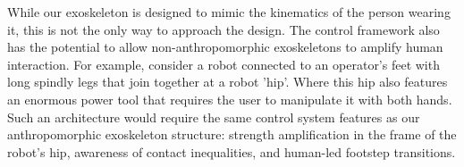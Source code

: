 \documentclass[utf8]{frontiersSCNS}
\renewcommand*{\cite}[1]{\citep{#1}}
\newcommand{\add}[1]{\textcolor[HTML]{8710b3}{#1}}
\begin{document}
While our exoskeleton is designed to mimic the kinematics of the person wearing it, this is not the only way to \add{approach} the design. The control framework also has the potential to allow non-anthropomorphic exoskeletons to amplify human interaction. \add{For example, consider} a robot connected to an operator's feet with long spindly legs that join together at a robot 'hip'. \add{Where} this hip also features an enormous power tool that requires the user to manipulate it with both hands. Such an architecture would require the same control system features as our anthropomorphic exoskeleton structure: strength amplification in the frame of the robot's hip, awareness of contact inequalities, and human-led footstep transitions.





\end{document}
